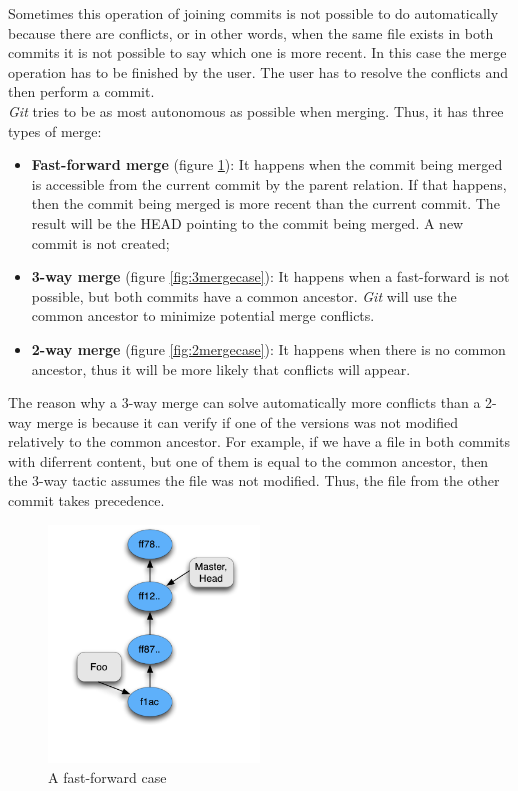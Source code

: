 Sometimes this operation of joining commits is not possible to do
automatically because there are conflicts, or in other words, when
the same file exists in both commits it is
not possible to say which one is more recent. In this case the merge
operation has to be finished by the user. The user has to resolve the
conflicts and then perform a commit.\\

\emph{Git} tries to be as most autonomous as possible when merging.
Thus, it has three types of merge:

\begin{itemize}
   \item \textbf{Fast-forward merge} (figure \ref{fig:fast_forward}):
   It happens when the commit being merged is accessible from the current commit by the 
   parent relation. If that happens, then the commit being merged is more recent
   than the current commit. The result will be the HEAD pointing to
   the commit being merged. A new commit is not created;
   
   \item \textbf{3-way merge} (figure \ref{fig:3mergecase}): 
   It happens when a fast-forward is not possible, but both commits have a common
   ancestor. \emph{Git} will use the common ancestor to minimize potential
   merge conflicts.
   
   \item \textbf{2-way merge} (figure \ref{fig:2mergecase}): 
   It happens when there is no
   common ancestor, thus it will be more likely that conflicts will
   appear.
\end{itemize}

The reason why a 3-way merge can solve automatically more conflicts than a 2-way
merge is because it can verify if one of the versions was not modified
relatively to the common ancestor. For example, if we have a file in
both commits with diferrent content, but one of them is equal to the
common ancestor, then the 3-way tactic assumes the file was not modified. Thus,
the file from the other commit takes precedence.

\begin{figure}[tp]
   \centering
   \includegraphics[width=0.5\textwidth]{images/fast_forward.png}
   \caption{A fast-forward case}\label{fig:fast_forward}
\end{figure}

